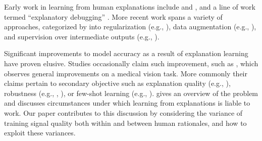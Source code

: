 Early work in learning from human explanations include \citet{zaidan_using_2007} and \citet{druck_active_2009}, and a line of work termed ``explanatory debugging'' \citep{kulesza_principles_2015,lertvittayakumjorn_explanation-based_2021}. More recent work spans a variety of approaches, categorized by \citet{hase_when_2021} into regularization (e.g., \citet{ross_right_2017}), data augmentation (e.g., \citet{hancock2018training}), and supervision over intermediate outputs (e.g., \citet{deyoung_eraser_2019, jayaram_human_2021}).


Significant improvements to model accuracy as a result of explanation learning have proven elusive. Studies occasionally claim such improvement, such as \citet{rieger_interpretations_2020}, which observes general improvements on a medical vision task.
More commonly their claims pertain to secondary objective such as explanation quality (e.g., \citet{plumb_regularizing_2020}), 
robustness (e.g., \citet{ross_right_2017}, \citet{srivastava_robustness_2020}),
or few-shot learning (e.g., \citet{yao_refining_2021}). 
\citet{hase_when_2021} gives an overview of the problem and discusses circumstances under which learning from explanations is liable to work. Our paper contributes to this discussion by considering the variance of training signal quality both within and between human rationales, and how to exploit these variances. 






